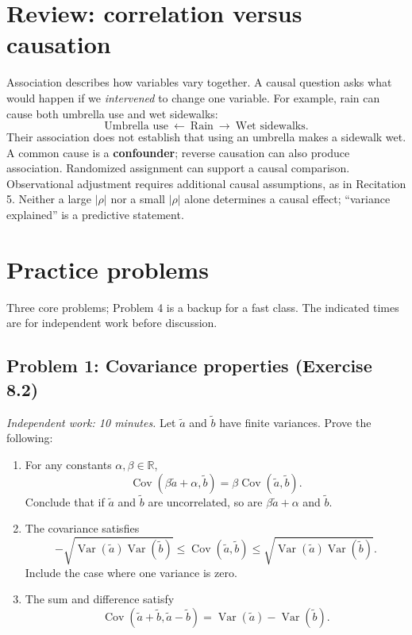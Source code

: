 \documentclass[11pt]{article}
\newcommand{\Var}{\operatorname{Var}}
\newcommand{\Cov}{\operatorname{Cov}}
\newcommand{\rv}[1]{\widetilde{#1}}
\newcommand{\workingspace}[1]{}
\newcommand{\workingspace}[1]{\vspace{#1}}
\begin{document}
\section{Review: correlation versus causation}
Association describes how variables vary together. A causal question asks
what would happen if we \emph{intervened} to change one variable.
For example, rain can cause both umbrella use and wet sidewalks:
\[
  \text{Umbrella use}\ \longleftarrow\ \text{Rain}\
  \longrightarrow\ \text{Wet sidewalks}.
\]
Their association does not establish that using an umbrella makes a
sidewalk wet. A common cause is a \textbf{confounder}; reverse causation
can also produce association. Randomized assignment can support a causal
comparison. Observational adjustment requires additional causal assumptions,
as in Recitation 5. Neither a large $|\rho|$ nor a small $|\rho|$ alone
determines a causal effect; ``variance explained'' is a predictive statement.

\newpage
\section*{Practice problems}
\noindent Three core problems; Problem 4 is a backup for a fast class.
The indicated times are for independent work before discussion.

\subsection*{Problem 1: Covariance properties (Exercise 8.2)}
\noindent\textit{Independent work: 10 minutes.}
Let $\rv{a}$ and $\rv{b}$ have finite variances. Prove the following:
\begin{enumerate}
  \item For any constants $\alpha,\beta\in\mathbb{R}$,
    \[
      \Cov(\beta\rv{a}+\alpha,\rv{b})
      =\beta\Cov(\rv{a},\rv{b}).
    \]
    Conclude that if $\rv{a}$ and $\rv{b}$ are uncorrelated, so are
    $\beta\rv{a}+\alpha$ and $\rv{b}$.
  \item The covariance satisfies
    \[
      -\sqrt{\Var(\rv{a})\Var(\rv{b})}
      \leq\Cov(\rv{a},\rv{b})
      \leq\sqrt{\Var(\rv{a})\Var(\rv{b})}.
    \]
    Include the case where one variance is zero.
  \item The sum and difference satisfy
    \[
      \Cov(\rv{a}+\rv{b},\rv{a}-\rv{b})
      =\Var(\rv{a})-\Var(\rv{b}).
    \]
\end{enumerate}
\workingspace{9cm}
\end{document}
